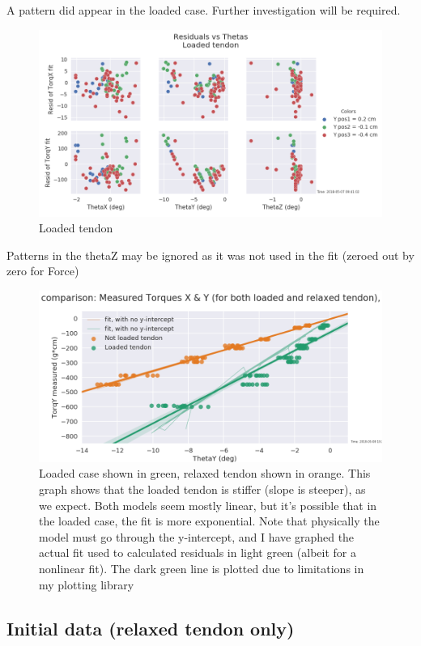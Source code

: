 \documentclass[preprint,12pt,3p]{elsarticle}
\begin{document}
A pattern did appear in the loaded case. Further investigation will be required.

\begin{figure}[H]
\centering
\includegraphics[width=.9\textwidth]{images/stiff/GOODResid_vs_Theta_loaded.png}
\caption{Loaded tendon}
\end{figure}

Patterns in the thetaZ may be ignored as it was not used in the fit (zeroed out by zero for Force)

\begin{figure}[H]
\centering
\includegraphics[width=.9\textwidth]{images/stiff/StiffnessComparison.png}
\caption{Loaded case shown in green, relaxed tendon shown in orange. This graph shows that the
loaded tendon is stiffer (slope is steeper), as we expect. Both models seem mostly linear, but it's
possible that in the loaded case, the fit is more exponential. Note that physically the model must
go through the y-intercept, and I have graphed the actual fit used to calculated residuals in light
green (albeit for a nonlinear fit). The dark green line is plotted due to limitations in my plotting
library}
\end{figure}

\subsection{Initial data (relaxed tendon only)}
\end{document}

